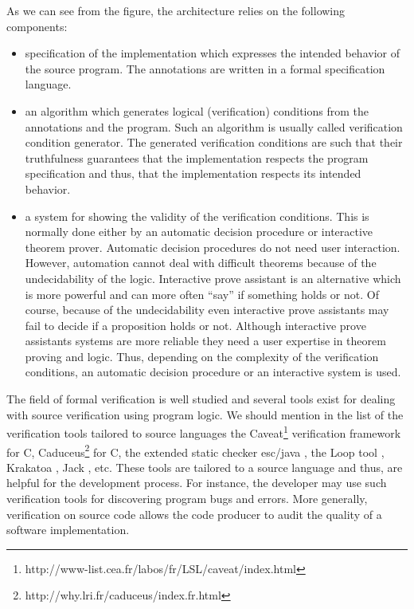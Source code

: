 As we can see from the figure, the architecture relies on the following components:
\begin{itemize} 
   \item specification of the implementation which expresses the intended behavior of the source program. The annotations
         are written in a formal specification language. 
   \item an algorithm which  generates logical (verification) conditions  from the annotations and the program.
         Such an algorithm is usually called verification condition generator. 
         The generated verification conditions are such that their truthfulness guarantees that the implementation respects the program specification  and thus,
	 that the implementation respects its intended behavior.
    
   \item a system for showing the validity of the verification conditions. This is normally done either by an automatic decision 
         procedure or interactive theorem prover.
         Automatic decision procedures do not need user interaction.
         However, automation cannot deal with difficult theorems because of the undecidability of the logic.
	 Interactive prove assistant is an alternative which is 
	 more powerful and can more often ``say'' if something holds or not. Of course, because of the undecidability 
	 even  interactive prove assistants may fail to decide if a proposition holds or not. Although interactive prove assistants
	 systems are more reliable they need a user expertise in theorem proving and logic. 
	 Thus, depending on the complexity of the verification conditions, an automatic decision procedure or an interactive system is used.

   \end{itemize} 



 The field of formal  verification is well studied and several  tools exist for
dealing with  source verification using program logic. We should mention in the list of the verification tools tailored to source languages
the Caveat\footnote{http://www-list.cea.fr/labos/fr/LSL/caveat/index.html} verification framework  for C,
 Caduceus\footnote{http://why.lri.fr/caduceus/index.fr.html} for C,  the extended static checker
esc/java \cite{escjava}, the Loop tool \cite{jacobs03java},
Krakatoa \cite{marche03krakatoa}, Jack \cite{BRL-JACK}, etc. These tools are tailored to a source language and thus,
 are helpful for the development process. For instance, the developer may use such verification tools for discovering program bugs and
 errors. More generally, verification on source code allows the code producer to audit the quality of a software implementation.
 
